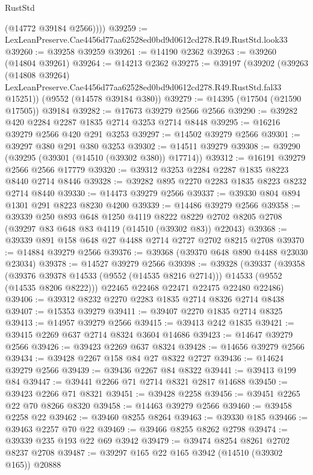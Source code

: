 \begin{lexlean}{RustStd}
\begin{coremodule}
          (@14772 @39184 @2566))))
@39259 := LexLeanPreserve.Cae4456d77aa62528ed0bd9d0612cd278.R49.RustStd.look33
@39260 := @39258 @39259
@39261 := @14190 @2362
@39263 := @39260 (@14804 @39261)
@39264 := @14213 @2362
@39275 := @39197
    (@39202
      (@39263
        (@14808 @39264)
        LexLeanPreserve.Cae4456d77aa62528ed0bd9d0612cd278.R49.RustStd.fal33
        @15251))
    (@9552 (@14578 @39184 @380))
@39279 := @14395 (@17504 (@21590 @17505)) @39184
@39282 := @17673 @39279 @2566 @2566
@39290 := @39282 @420 @2284 @2287 @1835 @2714 @3253 @2714 @8448
@39295 := @16216 @39279 @2566 @420 @291 @3253
@39297 := @14502 @39279 @2566
@39301 := @39297 @380 @291 @380 @3253
@39302 := @14511 @39279
@39308 := @39290 (@39295 (@39301 (@14510 (@39302 @380)) @17714))
@39312 := @16191 @39279 @2566 @2566 @17779
@39320 := @39312 @3253 @2284 @2287 @1835 @8223 @8440 @2714 @8446
@39328 := @39282 @895 @2270 @2283 @1835 @8223 @8232 @2714 @8440
@39330 := @14473 @39279 @2566
@39337 := @39330 @804 @894 @1301 @291 @8223 @8230 @4200
@39339 := @14486 @39279 @2566
@39358 := @39339
    @250
    @893
    @648
    @1250
    @4119
    @8222
    @8229
    @2702
    @8205
    @2708
    (@39297 @83 @648 @83 @4119 (@14510 (@39302 @83)) @22043)
@39368 := @39339 @891 @158 @648 @27 @4488 @2714 @2727 @2702 @8215 @2708
@39370 := @14884 @39279 @2566
@39376 := @39368 (@39370 @648 @890 @4488 @23030 @23034)
@39378 := @14527 @39279 @2566
@39398 := @39328
    (@39337
      (@39358
        (@39376 @39378 @14533 (@9552 (@14535 @8216 @2714)))
        @14533
        (@9552 (@14535 @8206 @8222)))
      @22465
      @22468
      @22471
      @22475
      @22480
      @22486)
@39406 := @39312 @8232 @2270 @2283 @1835 @2714 @8326 @2714 @8438
@39407 := @15353 @39279
@39411 := @39407 @2270 @1835 @2714 @8325
@39413 := @14957 @39279 @2566
@39415 := @39413 @242 @1835
@39421 := @39415 @2269 @637 @2714 @8324 @3604 @14686
@39423 := @14647 @39279 @2566
@39426 := @39423 @2269 @637 @8324
@39428 := @14656 @39279 @2566
@39434 := @39428 @2267 @158 @84 @27 @8322 @2727
@39436 := @14624 @39279 @2566
@39439 := @39436 @2267 @84 @8322
@39441 := @39413 @199 @84
@39447 := @39441 @2266 @71 @2714 @8321 @2817 @14688
@39450 := @39423 @2266 @71 @8321
@39451 := @39428 @2258
@39456 := @39451 @2265 @22 @70 @8266 @8320
@39458 := @14463 @39279 @2566
@39460 := @39458 @2258 @22
@39462 := @39460 @8255 @8264
@39463 := @39330 @185
@39466 := @39463 @2257 @70 @22
@39469 := @39466 @8255 @8262 @2798
@39474 := @39339 @235 @193 @22 @69 @3942
@39479 := @39474 @8254 @8261 @2702 @8237 @2708
@39487 := @39297 @165 @22 @165 @3942 (@14510 (@39302 @165)) @20888

\end{coremodule}
\end{lexlean}
